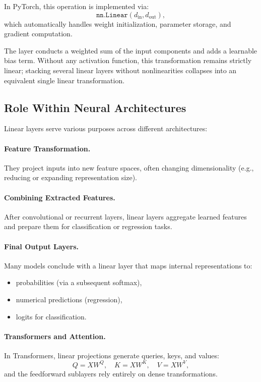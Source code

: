\documentclass[12pt,a4paper]{report}
\begin{document}
In PyTorch, this operation is implemented via:
\[
\texttt{nn.Linear}(d_{\text{in}}, d_{\text{out}}),
\]
which automatically handles weight initialization, parameter storage, and gradient computation.

The layer conducts a weighted sum of the input components and adds a learnable bias term.  
Without any activation function, this transformation remains strictly linear; stacking several linear layers without nonlinearities collapses into an equivalent single linear transformation.

\vspace{1em}
\subsection{Role Within Neural Architectures}

Linear layers serve various purposes across different architectures:

\paragraph{Feature Transformation.}  
They project inputs into new feature spaces, often changing dimensionality (e.g., reducing or expanding representation size).

\paragraph{Combining Extracted Features.}  
After convolutional or recurrent layers, linear layers aggregate learned features and prepare them for classification or regression tasks.

\paragraph{Final Output Layers.}  
Many models conclude with a linear layer that maps internal representations to:
\begin{itemize}
    \item probabilities (via a subsequent softmax),
    \item numerical predictions (regression),
    \item logits for classification.
\end{itemize}

\paragraph{Transformers and Attention.}  
In Transformers, linear projections generate queries, keys, and values:
\[
Q = XW^Q, \quad K = XW^K, \quad V = XW^V,
\]
and the feedforward sublayers rely entirely on dense transformations.
\end{document}
